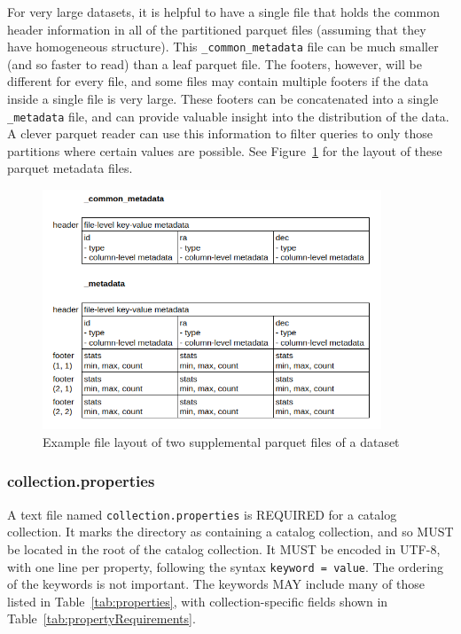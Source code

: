 \documentclass[11pt,a4paper]{ivoa}
\begin{document}
For very large datasets, it is helpful to have a single file that holds the common header information in all of the partitioned parquet files (assuming that they have homogeneous structure).
This \texttt{\_common\_metadata} file can be much smaller (and so faster to read) than a leaf parquet file.
The footers, however, will be different for every file, and some files may contain multiple footers if the data inside a single file is very large.
These footers can be concatenated into a single \texttt{\_metadata} file, and can provide valuable insight into the distribution of the data. 
A clever parquet reader can use this information to filter queries to only those partitions where certain values are possible.
See Figure~\ref{fig:parquetMetadata} for the layout of these parquet metadata files.

\begin{figure}
\centering
\includegraphics[width=0.9\textwidth]{metadata_files.png}
\caption{Example file layout of two supplemental parquet files of a dataset}
\label{fig:parquetMetadata}
\end{figure}

\subsubsection{collection.properties}\label{sec:collectionProperties}
A text file named \texttt{collection.properties} is REQUIRED for a catalog collection.
It marks the directory as containing a catalog collection, and so MUST be located in the 
root of the catalog collection.
It MUST be encoded in UTF-8, with one line per property, following the syntax \texttt{keyword = value}.
The ordering of the keywords is not important. 
The keywords MAY include many of those listed in Table~\ref{tab:properties}, with collection-specific fields shown in Table~\ref{tab:propertyRequirements}.
\end{document}
